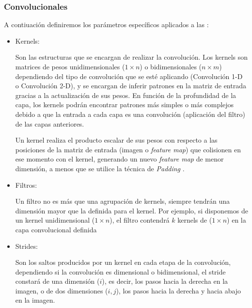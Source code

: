             \subsubsection{Convolucionales}

                A contiuación definiremos los parámetros específicos aplicados a las :

                \begin{itemize}

                    \item Kernels:

                        Son las estructuras que se encargan de realizar la convolución. Los kernels son matrices de pesos unidimensionales ($1 \times n$) o bidimensionales ($n \times m$) dependiendo del tipo de convolución que se esté aplicando (Convolución 1-D o Convolución 2-D), y se encargan de inferir patrones en la matriz de entrada gracias a la actualización de sus pesos. En función de la profundidad de la capa, los kernels podrán encontrar patrones más simples o más complejos debido a que la entrada a cada capa es una convolución (aplicación del filtro) de las capas anteriores.

                        Un kernel realiza el producto escalar de sus pesos con respecto a las posiciones de la matriz de entrada (imagen o \textit{feature map}) que colisionen en ese momento con el kernel, generando un nuevo \textit{feature map} de menor dimensión, a menos que se utilice la técnica de \textit{Padding} \cite{Kernels}.
                         
                    \item Filtros:

                        Un filtro no es más que una agrupación de kernels, siempre tendrán una dimensión mayor que la definida para el kernel. Por ejemplo, si disponemos de un kernel unidimensional ($1 \times n$), el filtro contendrá $k$ kernels de ($1 \times n$) en la capa convolucional definida \cite{FiltersFeatureMaps}

                    \item Strides:

                        Son los saltos producidos por un kernel en cada etapa de la convolución, dependiendo si la convolución es dimensional o bidimensional, el stride constará de una dimensión ($i$), es decir, los pasos hacia la derecha en la imagen, o de dos dimensiones ($i, j$), los pasos hacia la derecha y hacia abajo en la imagen.


\end{itemize}
